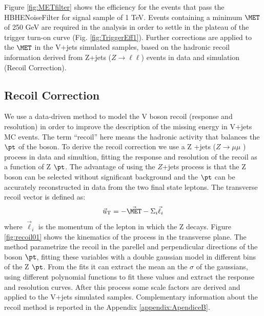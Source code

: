 Figure \ref{fig:METfilter} shows the efficiency for the events that pass the HBHENoiseFilter for signal sample of 1 TeV. Events containing a minimum $\MET$ of 250 GeV are required in the analysis in order to settle in the plateau of the trigger turn-on curve (Fig. \ref{fig:TriggerEff1}). Further corrections are applied to the $\MET$ in the V+jets simulated samples, based on the hadronic recoil information derived from Z+jets ($Z\rightarrow \ell \ell$)  events in data and simulation (Recoil Correction).

\subsection{Recoil Correction}

We use a data-driven method to model the V boson recoil (response and resolution) in order to improve the description of the missing energy in  V+jets MC events. The term ``recoil'' here means the hadronic activity that balances the $\pt$ of the boson.  To derive the recoil correction we use a Z +jets ($Z \to \mu \mu$ ) process in data and simultion, fitting the response and resolution of the recoil as a function of Z $\pt$. The advantage of using the $Z$+jets process is that the Z boson can be selected without significant background and the $\pt$ can be accurately reconstructed in data from the two final state leptons. The transverse recoil vector is defined as:
\begin{eqnarray}
\vec{u}_{\mathrm{T}} = -\vec{\MET}-\Sigma_{i} \vec{\ell}_{i}
\end{eqnarray}
where $\vec{\ell}_{i}$ is the momentum of the lepton in which the Z decays. Figure \ref{fig:recoil01} shows the kinematics of the process in the transverse plane. The method parametrize the recoil in the parellel and perpendicular directions of the boson $\pt$, fitting these variables with a double gaussian model in different bins of the Z $\pt$. From the fits it can extract the mean an the $\sigma$ of the gaussians, using different polynomial functions to fit these values and extract the response and resolution curves. After this process some scale factors are derived and applied to the  V+jets simulated samples. Complementary information about the recoil method is reported in the Appendix \ref{appendix:ApendiceB}.

